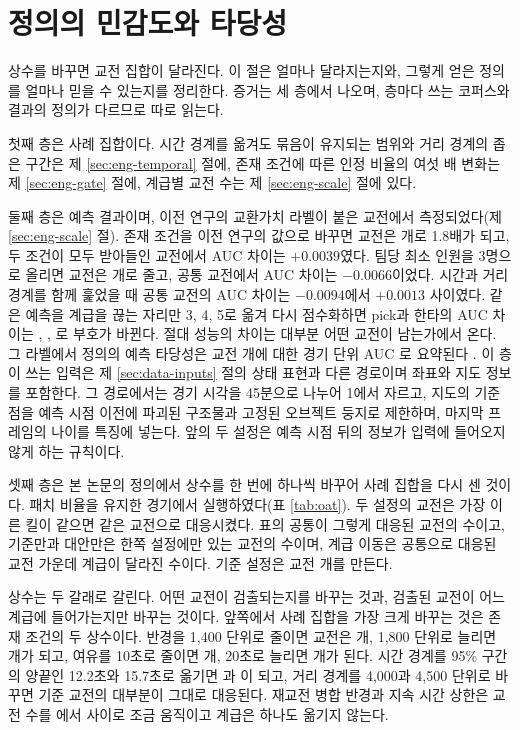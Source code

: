 \section{정의의 민감도와 타당성}
\label{sec:eng-sensitivity}
\label{sec:eng-validity}

상수를 바꾸면 교전 집합이 달라진다. 이 절은 얼마나 달라지는지와, 그렇게 얻은 정의를 얼마나 믿을 수 있는지를 정리한다. 증거는 세 층에서 나오며, 층마다 쓰는 코퍼스와 결과의 정의가 다르므로 따로 읽는다.

첫째 층은 사례 집합이다. 시간 경계를 옮겨도 묶음이 유지되는 범위와 거리 경계의 좁은 구간은 제 \ref{sec:eng-temporal} 절에, 존재 조건에 따른 인정 비율의 여섯 배 변화는 제 \ref{sec:eng-gate} 절에, 계급별 교전 수는 제 \ref{sec:eng-scale} 절에 있다.

둘째 층은 예측 결과이며, 이전 연구의 교환가치 라벨이 붙은 교전에서 측정되었다(제 \ref{sec:eng-scale} 절). 존재 조건을 이전 연구의 값으로 바꾸면 교전은 \numEngGateCog{}개로 1.8배가 되고, 두 조건이 모두 받아들인 교전에서 AUC 차이는 $+0.0039$였다. 팀당 최소 인원을 3명으로 올리면 교전은 \numEngMthree{}개로 줄고, 공통 교전에서 AUC 차이는 $-0.0066$이었다. 시간과 거리 경계를 함께 훑었을 때 공통 교전의 AUC 차이는 $-0.0094$에서 $+0.0013$ 사이였다. 같은 예측을 계급을 끊는 자리만 3, 4, 5로 옮겨 다시 점수화하면 pick과 한타의 AUC 차이는 \cutDiffThree{}, \cutDiffFour{}, \cutDiffFive{}로 부호가 바뀐다. 절대 성능의 차이는 대부분 어떤 교전이 남는가에서 온다. 그 라벨에서 정의의 예측 타당성은 교전 \numEngLineage{}개에 대한 경기 단위 AUC \aucLineageOOF{}로 요약된다 \cite{baek2026killconditioned}. 이 층이 쓰는 입력은 제 \ref{sec:data-inputs} 절의 상태 표현과 다른 경로이며 좌표와 지도 정보를 포함한다. 그 경로에서는 경기 시각을 45분으로 나누어 1에서 자르고, 지도의 기준점을 예측 시점 이전에 파괴된 구조물과 고정된 오브젝트 둥지로 제한하며, 마지막 프레임의 나이를 특징에 넣는다. 앞의 두 설정은 예측 시점 뒤의 정보가 입력에 들어오지 않게 하는 규칙이다.

셋째 층은 본 논문의 정의에서 상수를 한 번에 하나씩 바꾸어 사례 집합을 다시 센 것이다. 패치 비율을 유지한 \oatNrun{} 경기에서 실행하였다(표 \ref{tab:oat}). 두 설정의 교전은 가장 이른 킬이 같으면 같은 교전으로 대응시켰다. 표의 공통이 그렇게 대응된 교전의 수이고, 기준만과 대안만은 한쪽 설정에만 있는 교전의 수이며, 계급 이동은 공통으로 대응된 교전 가운데 계급이 달라진 수이다. 기준 설정은 교전 \oatRefEng{}개를 만든다.

상수는 두 갈래로 갈린다. 어떤 교전이 검출되는지를 바꾸는 것과, 검출된 교전이 어느 계급에 들어가는지만 바꾸는 것이다. 앞쪽에서 사례 집합을 가장 크게 바꾸는 것은 존재 조건의 두 상수이다. 반경을 1{,}400 단위로 줄이면 교전은 \oatRfourteenEng{}개, 1{,}800 단위로 늘리면 \oatReighteenEng{}개가 되고, 여유를 10초로 줄이면 \oatBtenEng{}개, 20초로 늘리면 \oatBtwentyEng{}개가 된다. 시간 경계를 95\% 구간의 양끝인 12.2초와 15.7초로 옮기면 \oatGtwelveEng{}과 \oatGfifteenEng{}이 되고, 거리 경계를 4{,}000과 4{,}500 단위로 바꾸면 기준 교전의 대부분이 그대로 대응된다. 재교전 병합 반경과 지속 시간 상한은 교전 수를 \oatMRoneEng{}에서 \oatMDfortyfiveEng{} 사이로 조금 움직이고 계급은 하나도 옮기지 않는다.

